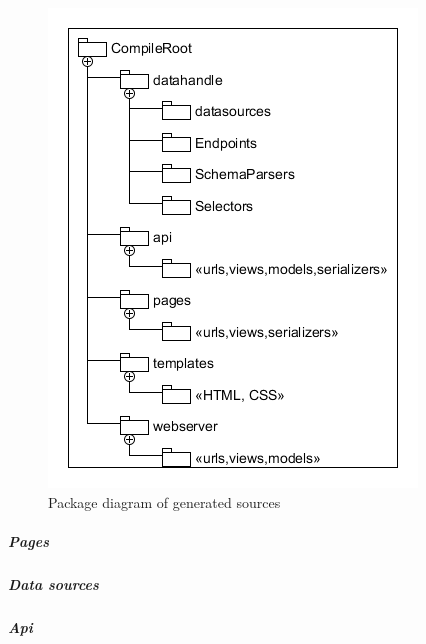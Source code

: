\begin{figure}
\begin{center}
\includegraphics[width=\linewidth]{images/PackageDiagram}
\end{center}
\caption{Package diagram of generated sources}
\label{fig:packagediagram}
\end{figure}
\subparagraph{Pages}
\subparagraph{Data sources}
\subparagraph{Api}
